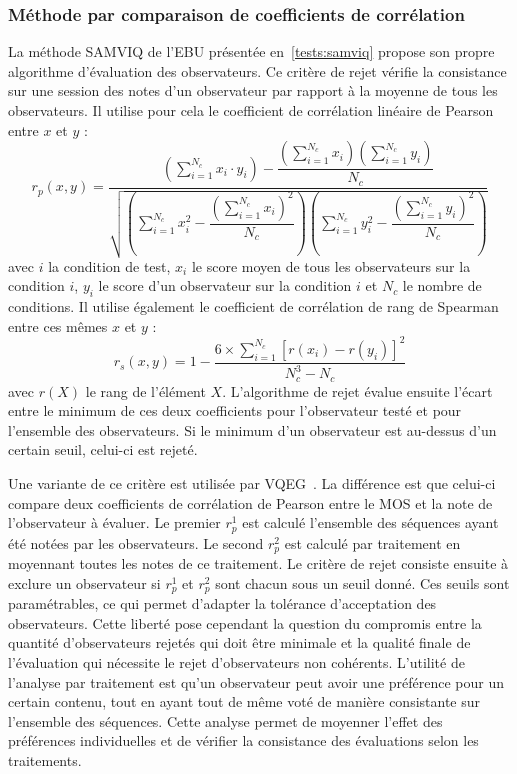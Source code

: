\subsubsection{Méthode par comparaison de coefficients de corrélation} \label{sssec:rejet-samviq}
La méthode SAMVIQ de l'EBU présentée en~\ref{tests:samviq} propose son propre algorithme d'évaluation des observateurs. Ce critère de rejet vérifie la consistance sur une session des notes d'un observateur par rapport à la moyenne de tous les observateurs. Il utilise pour cela le coefficient de corrélation linéaire de Pearson~\cite{pearson-rslpt} entre $x$ et $y$ :
\begin{equation}
r_p(x,y) = \frac{\left(\sum\limits_{i=1}^{N_c} x_i \cdot y_i\right) - \dfrac{\left(\sum\limits_{i=1}^{N_c} x_i\right)\left(\sum\limits_{i=1}^{N_c} y_i\right)}{{N_c}}}{\sqrt{\left(\sum\limits_{i=1}^{N_c} x_i^2 - \dfrac{\left(\sum\limits_{i=1}^{N_c} x_i\right)^2}{{N_c}} \right)\left(\sum\limits_{i=1}^{N_c} y_i^2 - \dfrac{\left(\sum\limits_{i=1}^{N_c} y_i\right)^2}{{N_c}} \right)}}
\label{eq:pearson}
\end{equation}
%
avec $i$ la condition de test, $x_i$ le score moyen de tous les observateurs sur la condition $i$, $y_i$ le score d'un observateur sur la condition $i$ et ${N_c}$ le nombre de conditions. Il utilise également le coefficient de corrélation de rang de Spearman~\cite{spearman-ajp} entre ces mêmes $x$ et $y$ :
\begin{equation}
r_s(x,y) = 1 - \dfrac{6\times\sum\limits_{i=1}^{N_c} \left[r(x_i) - r(y_i)\right]^2}{N_c^3 - N_c}
\label{eq:spearman}
\end{equation}
%
avec $r(X)$ le rang de l'élément $X$. L'algorithme de rejet évalue ensuite l'écart entre le minimum de ces deux coefficients pour l'observateur testé et pour l'ensemble des observateurs. Si le minimum d'un observateur est au-dessus d'un certain seuil, celui-ci est rejeté.

Une variante de ce critère est utilisée par VQEG~\cite{vqeg-MMtestplan}. La différence est que celui-ci compare deux coefficients de corrélation de Pearson entre le MOS et la note de l'observateur à évaluer. Le premier $r_p^\text{1}$ est calculé l'ensemble des séquences ayant été notées par les observateurs. Le second $r_p^\text{2}$ est calculé par traitement en moyennant toutes les notes de ce traitement. Le critère de rejet consiste ensuite à exclure un observateur si $r_p^\text{1}$ et $r_p^\text{2}$ sont chacun sous un seuil donné. Ces seuils sont paramétrables, ce qui permet d'adapter la tolérance d'acceptation des observateurs. Cette liberté pose cependant la question du compromis entre la quantité d'observateurs rejetés qui doit être minimale et la qualité finale de l'évaluation qui nécessite le rejet d'observateurs non cohérents. L'utilité de l'analyse par traitement est qu'un observateur peut avoir une préférence pour un certain contenu, tout en ayant tout de même voté de manière consistante sur l'ensemble des séquences. Cette analyse permet de moyenner l'effet des préférences individuelles et de vérifier la consistance des évaluations selon les traitements.

